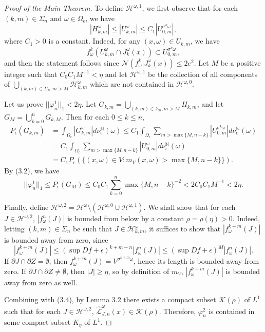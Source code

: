 \documentclass[11pt,oneside]{article}
\theoremstyle{plain}
\numberwithin{equation}{section}
\numberwithin{figure}{section}
\numberwithin{table}{section}
\begin{document}
\begin{proof}[Proof of the Main Theorem]
To define $\mathcal H^{\omega, 1}$, we first observe that for each $(k, m) \in \Sigma_n$ and $\omega \in \Omega_{\epsilon}$, we have 
\[
| H_{k, m}^{\omega}| \leq | U_{k, m}^{\omega}| \leq C_1 | U_{0, m}^{\sigma^k \omega}|,
\]
where $C_1>0$ is a constant. Indeed, for any $(x, \omega) \in U_{k, m}$, we have
\[
f_{\omega}^k (U_{k, m}^{\omega} \cap J_k^{\omega} (x)) \subset U_{0, m}^{\sigma^k \omega},
\] 
and then the statement follows since $\mathcal N(f_{\omega}^k | J_k^{\omega}(x)) \leq 2e^2$. Let $M$ be a positive integer such that $C_0 C_1 M^{-1} < \eta$ and let $\mathcal H^{\omega, 1}$ be the collection of all components of $\bigcup_{(k, m) \in \Sigma_n, m >M} \mathcal H_{k, m}^{\omega}$ which are not contained in $\mathcal H^{\omega, 0}$.  


Let us prove $|| \varphi_n^1 ||_1 < 2 \eta$. Let $G_{k, m} = \bigcup_{(k, m) \in \Sigma_n, m >M} H_{k, m}$, and let $G_M = \bigcup_{k=0}^n G_{k, M}$. Then for each $0 \leq k \leq n$,
\begin{align*}
P_{\epsilon} (G_{k, m}) & = \int_{\Omega_{\epsilon}} |G_{k, m}^{\omega}| d \nu_{\epsilon}^{\mathbb N} (\omega) \leq C_1 \int_{\Omega_{\epsilon}} \sum_{m > \max\{M, n-k \}} |U_{0, m}^{\sigma^k \omega}| d \nu_{\epsilon}^{\mathbb N} (\omega) \\
& = C_1 \int_{\Omega_{\epsilon}} \sum_{m > \max\{M, n-k \}} |U_{0, m}^{\omega}| d \nu_{\epsilon}^{\mathbb N} (\omega) \\
& = C_1 P_{\epsilon} (\{ (x, \omega) \in V : m_V(x, \omega) > \max\{M, n-k \} \}).
\end{align*}
By (3.2), we have
\[
|| \varphi_n^1 ||_1 \leq P_{\epsilon} (G_M) \leq C_0 C_1 \sum_{k=0}^{n} \max \{M, n-k \}^{-2} < 2 C_0 C_1 M^{-1} < 2 \eta.
\]


Finally, define $\mathcal H^{\omega, 2} = \mathcal H^{\omega} \setminus (\mathcal H^{\omega, 0} \cup \mathcal H^{\omega, 1})$. We shall show that for each $J \in \mathcal H^{\omega, 2}$, $|f_{\omega}^n (J)|$ is bounded from below by a constant $\rho = \rho(\eta) > 0$. Indeed, letting $(k, m) \in \Sigma_n$ be such that $J \in \mathcal H^{\omega}_{k, m}$, it suffices to show that $|f_{\omega}^{k+m}(J)|$ is bounded away from zero, since 
\[
|f_{\omega}^{k+m}(J)| \leq (\sup Df + \epsilon)^{k+m-n} |f_{\omega}^n (J)| \leq (\sup Df + \epsilon)^{M} |f_{\omega}^n (J)|.
\]
If $\partial J \cap \partial Z = \emptyset$, then $f_{\omega}^{k+m}(J)= V^{\sigma^{k+m} \omega}$, hence its length is bounded away from zero. If $\partial J \cap \partial Z \neq \emptyset$, then $|J| \geq \eta$, so by definition of $m_V$, $|f_{\omega}^{k+m}(J)|$ is bounded away from zero as well.


Combining with (3.4), by Lemma 3.2 there exists a compact subset $\mathcal K(\rho)$ of $L^1$ such that for each $J \in \mathcal H^{\omega, 2}$, $\hat {\mathcal L}_{J, n}^{\omega}(x)  \in \mathcal K(\rho)$. Therefore, $\varphi_n^2$ is contained in some compact subset $K_{\eta}$ of $L^1$.


\end{proof}
\end{document}
